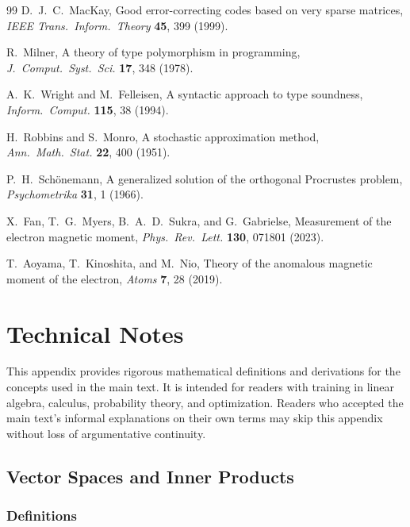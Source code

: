 \documentclass[a4paper,twocolumn,11pt]{article}
\begin{document}
\begin{thebibliography}{99}
D.~J.~C.~MacKay,
Good error-correcting codes based on very sparse matrices,
\emph{IEEE Trans.\ Inform.\ Theory} \textbf{45}, 399 (1999).

R.~Milner,
A theory of type polymorphism in programming,
\emph{J.\ Comput.\ Syst.\ Sci.} \textbf{17}, 348 (1978).

A.~K.~Wright and M.~Felleisen,
A syntactic approach to type soundness,
\emph{Inform.\ Comput.} \textbf{115}, 38 (1994).

H.~Robbins and S.~Monro,
A stochastic approximation method,
\emph{Ann.\ Math.\ Stat.} \textbf{22}, 400 (1951).

P.~H.~Sch\"onemann,
A generalized solution of the orthogonal Procrustes problem,
\emph{Psychometrika} \textbf{31}, 1 (1966).

X.~Fan, T.~G.~Myers, B.~A.~D.~Sukra, and G.~Gabrielse,
Measurement of the electron magnetic moment,
\emph{Phys.\ Rev.\ Lett.} \textbf{130}, 071801 (2023).

T.~Aoyama, T.~Kinoshita, and M.~Nio,
Theory of the anomalous magnetic moment of the electron,
\emph{Atoms} \textbf{7}, 28 (2019).

\end{thebibliography}

\appendix
\onecolumn

\section{Technical Notes}
\label{app:technical}

This appendix provides rigorous mathematical definitions and derivations for the concepts used in the main text. It is intended for readers with training in linear algebra, calculus, probability theory, and optimization. Readers who accepted the main text's informal explanations on their own terms may skip this appendix without loss of argumentative continuity.

\subsection{Vector Spaces and Inner Products}
\label{sec:A1}

\subsubsection*{Definitions}
\end{document}
